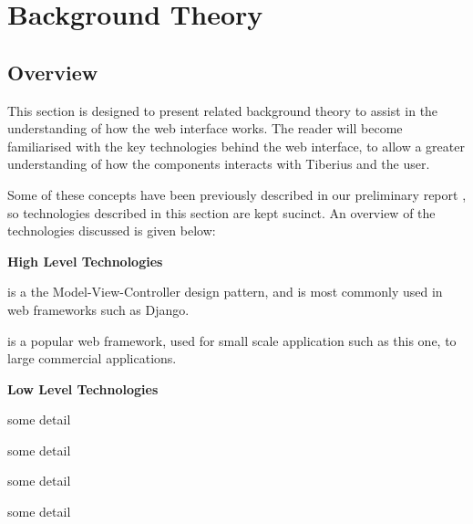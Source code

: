 \section{Background Theory}

\subsection{Overview}
This section is designed to present related background theory to assist in the
understanding of how the web interface works. The reader will become
familiarised with the key technologies behind the web interface, to allow a
greater understanding of how the components interacts with Tiberius and the
user.

Some of these concepts have been previously described in our preliminary report \cite{tibby-lit-review}, so technologies described in this section are kept sucinct. An overview of
the technologies discussed is given below:

\textbf{High Level Technologies}

\begin{description}[align=left]
\item [MVC] is a the Model-View-Controller design pattern, and is most commonly
used in web frameworks such as Django.

\item [Django] is a popular web framework, used for small scale application
such as this one, to large commercial applications.

\end{description}

\textbf{Low Level Technologies}

\begin{description}[align=left]
\item [HTTP] some detail
\item [TCP] some detail
\item [UDP] some detail
\item [VPN] some detail
\end{description}

